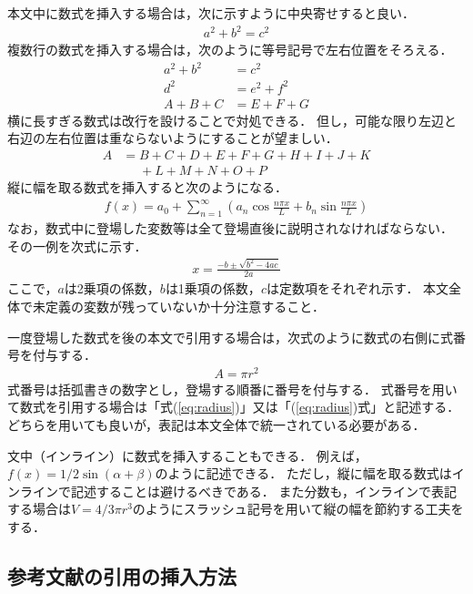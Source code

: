 \documentclass[a4j]{jsarticle}
\begin{document}
本文中に数式を挿入する場合は，次に示すように中央寄せすると良い．
\begin{align}
  \nonumber  a^2 + b^2 = c^2
\end{align}
複数行の数式を挿入する場合は，次のように等号記号で左右位置をそろえる．
\begin{align}
  \nonumber  a^2 + b^2 &= c^2 \\
  \nonumber d^2 &= e^2 + f^2 \\
  \nonumber A + B + C &= E + F + G
\end{align}
横に長すぎる数式は改行を設けることで対処できる．
但し，可能な限り左辺と右辺の左右位置は重ならないようにすることが望ましい．
\begin{align}
  \nonumber  A &= B + C + D + E + F + G + H + I + J + K \\
  \nonumber &\phantom= + L + M + N + O + P
\end{align}
縦に幅を取る数式を挿入すると次のようになる．
\begin{align}
  \nonumber  f(x) = a_0 + \sum_{n=1}^{\infty} \left( a_n \cos \frac{ n\pi x }{ L } + b_n\sin \frac{ n\pi x }{ L } \right)
\end{align}
なお，数式中に登場した変数等は全て登場直後に説明されなければならない．
その一例を次式に示す．
\begin{align}
  \nonumber  x = \frac{ -b \pm \sqrt{ b^2 -4ac } }{ 2a }
\end{align}
ここで，$a$は2乗項の係数，$b$は1乗項の係数，$c$は定数項をそれぞれ示す．
本文全体で未定義の変数が残っていないか十分注意すること．

一度登場した数式を後の本文で引用する場合は，次式のように数式の右側に式番号を付与する．
\begin{align}
  A = \pi r^2 \label{eq:radius}
\end{align}
式番号は括弧書きの数字とし，登場する順番に番号を付与する．
式番号を用いて数式を引用する場合は「式(\ref{eq:radius})」又は「(\ref{eq:radius})式」と記述する．
どちらを用いても良いが，表記は本文全体で統一されている必要がある．

文中（インライン）に数式を挿入することもできる．
例えば，$f(x) = 1/2 \sin(\alpha + \beta)$のように記述できる．
ただし，縦に幅を取る数式はインラインで記述することは避けるべきである．
また分数も，インラインで表記する場合は$V = 4/3\pi r^3$のようにスラッシュ記号を用いて縦の幅を節約する工夫をする．

\subsection{参考文献の引用の挿入方法}
\end{document}

